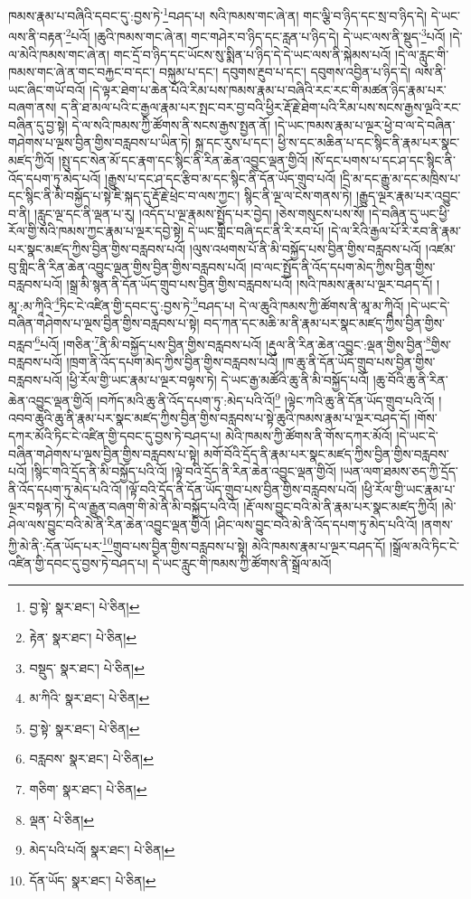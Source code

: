 ཁམས་རྣམ་པ་བཞིའི་དབང་དུ་:བྱས་ཏེ་\footnote{བྱ་སྟེ་  སྣར་ཐང་།  པེ་ཅིན། }བཤད་པ། སའི་ཁམས་གང་ཞེ་ན། གང་ལྕི་བ་ཉིད་དང་སྲ་བ་ཉིད་དེ། དེ་ཡང་ལས་ནི་བརྟན་\footnote{རྟེན་  སྣར་ཐང་།  པེ་ཅིན། }པའོ། །ཆུའི་ཁམས་གང་ཞེ་ན། གང་གཤེར་བ་ཉིད་དང་རླན་པ་ཉིད་དེ། དེ་ཡང་ལས་ནི་སྡུད་\footnote{བསྡུད་  སྣར་ཐང་།  པེ་ཅིན། }པའོ། །དེ་ལ་མེའི་ཁམས་གང་ཞེ་ན། གང་དྲོ་བ་ཉིད་དང་ཡོངས་སུ་སྨིན་པ་ཉིད་དེ་དེ་ཡང་ལས་ནི་སྐེམས་པའོ། །དེ་ལ་རླུང་གི་ཁམས་གང་ཞེ་ན་གང་བརྐྱང་བ་དང་། བསྐུམ་པ་དང་། དབུགས་རྔུབ་པ་དང་། དབུགས་འབྱིན་པ་ཉིད་དེ། ལས་ནི་ཡང་ཞིང་གཡོ་བའོ། །དེ་ལྟར་ཐེག་པ་ཆེན་པོའི་རིམ་པས་ཁམས་རྣམ་པ་བཞིའི་རང་རང་གི་མཚན་ཉིད་རྣམ་པར་བཞག་ནས། ད་ནི་ཐ་མལ་པའི་ང་རྒྱལ་རྣམ་པར་སྤང་བར་བྱ་བའི་ཕྱིར་རྡོ་རྗེ་ཐེག་པའི་རིམ་པས་སངས་རྒྱས་ལྔའི་རང་བཞིན་དུ་བྱ་སྟེ། དེ་ལ་སའི་ཁམས་ཀྱི་ཚོགས་ནི་སངས་རྒྱས་སྤྱན་ནོ། །དེ་ཡང་ཁམས་རྣམ་པ་ལྔར་ཕྱེ་བ་ལ་དེ་བཞིན་གཤེགས་པ་ལྔས་བྱིན་གྱིས་བརླབས་པ་ཡིན་ཏེ། སྐྲ་དང་རུས་པ་དང་། ཕྱི་ས་དང་མཆིན་པ་དང་སྙིང་ནི་རྣམ་པར་སྣང་མཛད་ཀྱིའོ། །སྤུ་དང་སེན་མོ་དང་རྣག་དང་སྙིང་ནི་རིན་ཆེན་འབྱུང་ལྡན་གྱིའོ། །སོ་དང་པགས་པ་དང་ཤ་དང་སྙིང་ནི་འོད་དཔག་ཏུ་མེད་པའོ། །རྒྱུས་པ་དང་ཤ་དང་རྩིབ་མ་དང་སྙིང་ནི་དོན་ཡོད་གྲུབ་པའོ། །དྲི་མ་དང་རྒྱུ་མ་དང་མཁྲིས་པ་དང་སྙིང་ནི་མི་བསྐྱོད་པ་སྟེ་ཇི་སྐད་དུ་རྡོ་རྗེ་ཕྲེང་བ་ལས་ཀྱང་། སྙིང་ནི་ལྔ་ལ་ངེས་གནས་ཏེ། །རྒྱུད་ལྔར་རྣམ་པར་འབྱུང་བ་ནི། །རླུང་ལྔ་དང་ནི་ལྡན་པ་རུ། །འདོད་པ་ལྔ་རྣམས་སྤྱོད་པར་བྱེད། །ཅེས་གསུངས་པས་སོ། །དེ་བཞིན་དུ་ཡང་ཕྱི་རོལ་གྱི་སའི་ཁམས་ཀྱང་རྣམ་པ་ལྔར་དབྱེ་སྟེ། དེ་ཡང་གླིང་བཞི་དང་ནི་རི་རབ་པོ། །དེ་ལ་རིའི་རྒྱལ་པོ་རི་རབ་ནི་རྣམ་པར་སྣང་མཛད་ཀྱིས་བྱིན་གྱིས་བརླབས་པའོ། །ལུས་འཕགས་པོ་ནི་མི་བསྐྱོད་པས་བྱིན་གྱིས་བརླབས་པའོ། །འཛམ་བུ་གླིང་ནི་རིན་ཆེན་འབྱུང་ལྡན་གྱིས་བྱིན་གྱིས་བརླབས་པའོ། །བ་ལང་སྤྱོད་ནི་འོད་དཔག་མེད་ཀྱིས་བྱིན་གྱིས་བརླབས་པའོ། །སྒྲ་མི་སྙན་ནི་དོན་ཡོད་གྲུབ་པས་བྱིན་གྱིས་བརླབས་པའོ། །སའི་ཁམས་རྣམ་པ་ལྔར་བཤད་དོ། །མཱ་:མ་ཀཱིའི་\footnote{མ་ཀིའི་  སྣར་ཐང་།  པེ་ཅིན། }ཏིང་ངེ་འཛིན་གྱི་དབང་དུ་:བྱས་ཏེ་\footnote{བྱ་སྟེ་  སྣར་ཐང་།  པེ་ཅིན། }བཤད་པ། དེ་ལ་ཆུའི་ཁམས་ཀྱི་ཚོགས་ནི་མཱ་མ་ཀཱིའོ། །དེ་ཡང་དེ་བཞིན་གཤེགས་པ་ལྔས་བྱིན་གྱིས་བརླབས་པ་སྟེ། བད་ཀན་དང་མཆི་མ་ནི་རྣམ་པར་སྣང་མཛད་ཀྱིས་བྱིན་གྱིས་བརླབ་\footnote{བརླབས་  སྣར་ཐང་།  པེ་ཅིན། }པའོ། །གཅིན་\footnote{གཅིག་  སྣར་ཐང་།  པེ་ཅིན། }ནི་མི་བསྐྱོད་པས་བྱིན་གྱིས་བརླབས་པའོ། །རྡུལ་ནི་རིན་ཆེན་འབྱུང་:ལྡན་གྱིས་བྱིན་\footnote{ལྡན་  པེ་ཅིན། }གྱིས་བརླབས་པའོ། །ཁྲག་ནི་འོད་དཔག་མེད་ཀྱིས་བྱིན་གྱིས་བརླབས་པའོ། །ཁ་ཆུ་ནི་དོན་ཡོད་གྲུབ་པས་བྱིན་གྱིས་བརླབས་པའོ། །ཕྱི་རོལ་གྱི་ཡང་རྣམ་པ་ལྔར་བལྟས་ཏེ། དེ་ཡང་རྒྱ་མཚོའི་ཆུ་ནི་མི་བསྐྱོད་པའོ། །ཆུ་བོའི་ཆུ་ནི་རིན་ཆེན་འབྱུང་ལྡན་གྱིའོ། །བཀོད་མའི་ཆུ་ནི་འོད་དཔག་ཏུ་:མེད་པའི་འོ།\footnote{མེད་པའི་པའོ།  སྣར་ཐང་།  པེ་ཅིན། } །ལྟེང་ཀའི་ཆུ་ནི་དོན་ཡོད་གྲུབ་པའི་འོ། །འབབ་ཆུའི་ཆུ་ནི་རྣམ་པར་སྣང་མཛད་ཀྱིས་བྱིན་གྱིས་བརླབས་པ་སྟེ་ཆུའི་ཁམས་རྣམ་པ་ལྔར་བཤད་དོ། །གོས་དཀར་མོའི་ཏིང་ངེ་འཛིན་གྱི་དབང་དུ་བྱས་ཏེ་བཤད་པ། མེའི་ཁམས་ཀྱི་ཚོགས་ནི་གོས་དཀར་མོའོ། །དེ་ཡང་དེ་བཞིན་གཤེགས་པ་ལྔས་བྱིན་གྱིས་བརླབས་པ་སྟེ། མགོ་བོའི་དྲོད་ནི་རྣམ་པར་སྣང་མཛད་ཀྱིས་བྱིན་གྱིས་བརླབས་པའོ། །སྙིང་གའི་དྲོད་ནི་མི་བསྐྱོད་པའི་འོ། །ལྟེ་བའི་དྲོད་ནི་རིན་ཆེན་འབྱུང་ལྡན་གྱིའོ། །ཡན་ལག་ཐམས་ཅད་ཀྱི་དྲོད་ནི་འོད་དཔག་ཏུ་མེད་པའི་འོ། །ལྟོ་བའི་དྲོད་ནི་དོན་ཡོད་གྲུབ་པས་བྱིན་གྱིས་བརླབས་པའོ། །ཕྱི་རོལ་གྱི་ཡང་རྣམ་པ་ལྔར་བསྟན་ཏེ། དེ་ལ་རྒྱུན་བཞག་གི་མེ་ནི་མི་བསྐྱོད་པའི་འོ། །རྡོ་ལས་བྱུང་བའི་མེ་ནི་རྣམ་པར་སྣང་མཛད་ཀྱིའོ། །མེ་ཤེལ་ལས་བྱུང་བའི་མེ་ནི་རིན་ཆེན་འབྱུང་ལྡན་གྱིའོ། །ཤིང་ལས་བྱུང་བའི་མེ་ནི་འོད་དཔག་ཏུ་མེད་པའི་འོ། །ནགས་ཀྱི་མེ་ནི་:དོན་ཡོད་པར་\footnote{དོན་ཡོད་  སྣར་ཐང་།  པེ་ཅིན། }གྲུབ་པས་བྱིན་གྱིས་བརླབས་པ་སྟེ། མེའི་ཁམས་རྣམ་པ་ལྔར་བཤད་དོ། །སྒྲོལ་མའི་ཏིང་ངེ་འཛིན་གྱི་དབང་དུ་བྱས་ཏེ་བཤད་པ། དེ་ཡང་རླུང་གི་ཁམས་ཀྱི་ཚོགས་ནི་སྒྲོལ་མའོ། 